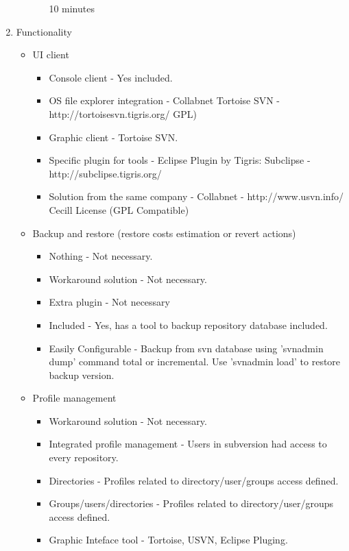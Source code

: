 \documentclass[11pt]{scrartcl}
\begin{document}
\begin{enumerate}
\begin{itemize}
\begin{itemize}
 10 minutes
        \end{itemize}
    \end{itemize}
    \item Functionality
        \begin{itemize}
	    \item UI client
            \begin{itemize}
                \item Console client - Yes included.
                \item OS file explorer integration - Collabnet Tortoise SVN - http://tortoisesvn.tigris.org/ GPL)
                \item Graphic client - Tortoise SVN.
                \item Specific plugin for tools - Eclipse Plugin by Tigris: Subclipse - http://subclipse.tigris.org/
                \item Solution from the same company - Collabnet - http://www.usvn.info/ Cecill License (GPL Compatible)
            \end{itemize}
	    \item Backup and restore (restore costs estimation or revert actions)
            \begin{itemize}
                \item Nothing - Not necessary.
                \item Workaround solution - Not necessary.
                \item Extra plugin - Not necessary
                \item Included - Yes, has a tool to backup repository database included.
                \item Easily Configurable - Backup from svn database using 'svnadmin dump' command total or incremental. Use 'svnadmin load' to restore backup version.
            \end{itemize}

	    \item Profile management 
            \begin{itemize}
                \item Workaround solution - Not necessary.
                \item Integrated profile management - Users in subversion had access to every repository.
                \item Directories - Profiles related to directory/user/groups access defined.
                \item Groups/users/directories - Profiles related to directory/user/groups access defined.
                \item Graphic Inteface tool - Tortoise, USVN, Eclipse Pluging.
            \end{itemize}
        \end{itemize}


\end{enumerate}
\end{document}
